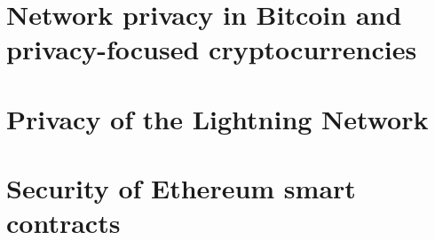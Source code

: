 \documentclass[
11pt, %
english, %
singlespacing, %
headsepline, %
]{MastersDoctoralThesis} %
\author{Sergei \textsc{Tikhomirov}} %
\begin{document}



\mainmatter %

\pagestyle{thesis} %




\part{Network privacy in Bitcoin and privacy-focused cryptocurrencies}
\label{Part1Privacy}




\part{Privacy of the Lightning Network}
\label{Part2Lightning}





\part{Security of Ethereum smart contracts}
\label{Part3Ethereum}







\printbibliography[heading=bibintoc]
\setcounter{secnumdepth}{-1}


\end{document}
